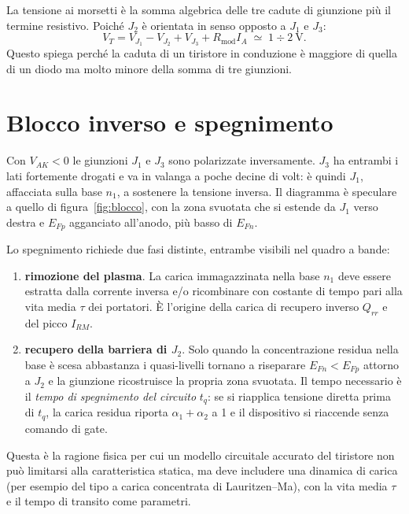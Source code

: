 \documentclass[11pt,a4paper]{article}
\begin{document}
La tensione ai morsetti è la somma algebrica delle tre cadute di giunzione più il
termine resistivo. Poiché $J_2$ è orientata in senso opposto a $J_1$ e $J_3$:
\begin{equation}
V_T = V_{J_1} - V_{J_2} + V_{J_3} + R_{\text{mod}} I_A \;\simeq\; 1\div 2~\text{V}.
\end{equation}
Questo spiega perché la caduta di un tiristore in conduzione è maggiore di quella
di un diodo ma molto minore della somma di tre giunzioni.

\section{Blocco inverso e spegnimento}

Con $V_{AK}<0$ le giunzioni $J_1$ e $J_3$ sono polarizzate inversamente. $J_3$ ha
entrambi i lati fortemente drogati e va in valanga a poche decine di volt: è
quindi $J_1$, affacciata sulla base $n_1$, a sostenere la tensione inversa. Il
diagramma è speculare a quello di figura~\ref{fig:blocco}, con la zona svuotata
che si estende da $J_1$ verso destra e $E_{Fp}$ agganciato all'anodo, più basso
di $E_{Fn}$.

Lo spegnimento richiede due fasi distinte, entrambe visibili nel quadro a bande:
\begin{enumerate}\itemsep2pt
  \item \textbf{rimozione del plasma}. La carica immagazzinata nella base $n_1$
        deve essere estratta dalla corrente inversa e/o ricombinare con costante
        di tempo pari alla vita media $\tau$ dei portatori. È l'origine della
        carica di recupero inverso $Q_{rr}$ e del picco $I_{RM}$.
  \item \textbf{recupero della barriera di $J_2$}. Solo quando la concentrazione
        residua nella base è scesa abbastanza i quasi-livelli tornano a
        riseparare $E_{Fn}<E_{Fp}$ attorno a $J_2$ e la giunzione ricostruisce la
        propria zona svuotata. Il tempo necessario è il \emph{tempo di spegnimento
        del circuito} $t_q$: se si riapplica tensione diretta prima di $t_q$, la
        carica residua riporta $\alpha_1+\alpha_2$ a 1 e il dispositivo si
        riaccende senza comando di gate.
\end{enumerate}
Questa è la ragione fisica per cui un modello circuitale accurato del tiristore
non può limitarsi alla caratteristica statica, ma deve includere una dinamica di
carica (per esempio del tipo a carica concentrata di Lauritzen--Ma), con la vita
media $\tau$ e il tempo di transito come parametri.
\end{document}
